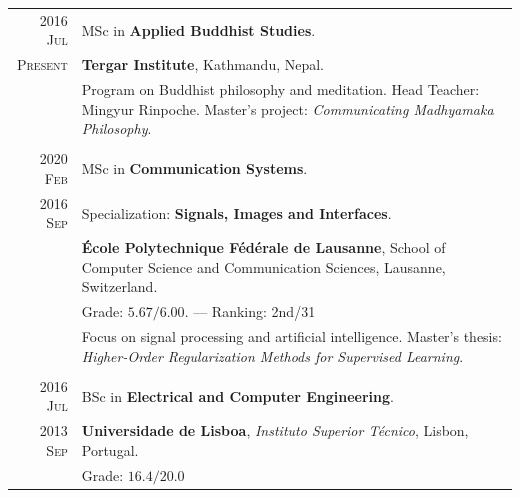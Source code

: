 \documentclass[a4paper,11pt]{article}
\begin{document}
    \begin{tabular}{r|p{13cm}}

      \textsc{\phantom{5}2016 Jul} &
      MSc in \textbf{Applied Buddhist Studies}. \\
      \textsc{Present} &  \footnotesize{\textbf{Tergar Institute}, Kathmandu, Nepal.} \\
      & \footnotesize{
        Program on Buddhist philosophy and meditation. Head Teacher: Mingyur Rinpoche.
        Master's project: \emph{Communicating Madhyamaka Philosophy}.
      } \\
      \multicolumn{2}{c}{} \\


      \textsc{2020 Feb}  &
      MSc in \textbf{Communication Systems}. \\
      \textsc{2016 Sep} & Specialization: \textbf{Signals, Images and Interfaces}. \\
      & \footnotesize{\textbf{École Polytechnique Fédérale de Lausanne}, School of Computer Science and Communication Sciences, Lausanne, Switzerland.} \\
      & \footnotesize{
      Grade: $\bm{5.67/6.00}$.} — Ranking: 2nd/31 \\
      & \footnotesize{
        Focus on signal processing and artificial intelligence.
        Master's thesis: \emph{Higher-Order Regularization Methods for Supervised Learning}. 
      } \\
      \multicolumn{2}{c}{} \\

      \textsc{\phantom{5}2016 Jul} &
      BSc in \textbf{Electrical and Computer Engineering}. \\
      \textsc{2013 Sep} &  \footnotesize{\textbf{Universidade de Lisboa}, \emph{Instituto Superior Técnico}, Lisbon, Portugal.} \\
      & \footnotesize{Grade: $\bm{16.4/20.0}$}
    \end{tabular}


\end{document}
